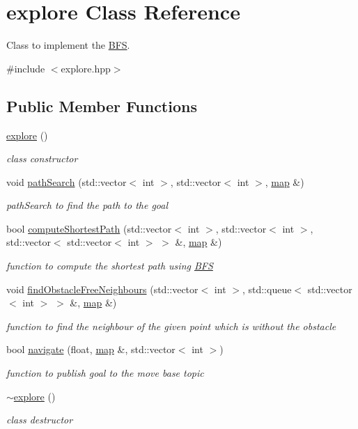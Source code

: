 \hypertarget{classexplore}{}\section{explore Class Reference}
\label{classexplore}


Class to implement the \hyperlink{classBFS}{B\+FS}.  




{\ttfamily \#include $<$explore.\+hpp$>$}

\subsection*{Public Member Functions}
\begin{DoxyCompactItemize}
\item 
\hyperlink{classexplore_a1f0ce75d7c2beafbcd80320379788e7d}{explore} ()
\begin{DoxyCompactList}\small\item\em class constructor \end{DoxyCompactList}\item 
void \hyperlink{classexplore_a1e21ba2b5ae23bed33de7856e1418b64}{path\+Search} (std\+::vector$<$ int $>$, std\+::vector$<$ int $>$, \hyperlink{classmap}{map} \&)
\begin{DoxyCompactList}\small\item\em path\+Search to find the path to the goal \end{DoxyCompactList}\item 
bool \hyperlink{classexplore_a402fe39518e7024b1f49cd000c1620ed}{compute\+Shortest\+Path} (std\+::vector$<$ int $>$, std\+::vector$<$ int $>$, std\+::vector$<$ std\+::vector$<$ int $>$ $>$ \&, \hyperlink{classmap}{map} \&)
\begin{DoxyCompactList}\small\item\em function to compute the shortest path using \hyperlink{classBFS}{B\+FS} \end{DoxyCompactList}\item 
void \hyperlink{classexplore_ab529fa2c030a29a5ac687b26b61b0663}{find\+Obstacle\+Free\+Neighbours} (std\+::vector$<$ int $>$, std\+::queue$<$ std\+::vector$<$ int $>$ $>$ \&, \hyperlink{classmap}{map} \&)
\begin{DoxyCompactList}\small\item\em function to find the neighbour of the given point which is without the obstacle \end{DoxyCompactList}\item 
bool \hyperlink{classexplore_a668d5b972220ff43b4680beb1e889dd4}{navigate} (float, \hyperlink{classmap}{map} \&, std\+::vector$<$ int $>$)
\begin{DoxyCompactList}\small\item\em function to publish goal to the move base topic \end{DoxyCompactList}\item 
\hyperlink{classexplore_a65b7817d6755089698fa978f9e273750}{$\sim$explore} ()
\begin{DoxyCompactList}\small\item\em class destructor \end{DoxyCompactList}\end{DoxyCompactItemize}
